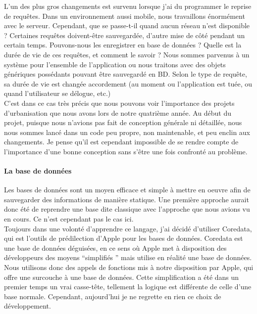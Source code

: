 \documentclass{article}
\begin{document}
		L'un des plus gros changements est survenu lorsque j'ai du programmer le reprise de requêtes. Dans un environnement aussi mobile, nous travaillons énormément avec le serveur. Cependant, que se passe-t-il quand aucun réseau n'est disponible ? Certaines requêtes doivent-être sauvegardée, d'autre mise de côté pendant un certain temps. Pouvons-nous les enregistrer en base de données ? Quelle est la durée de vie de ces requêtes, et comment le savoir ? Nous sommes parvenus à un système pour l'ensemble de l'application ou nous traitons avec des objets génériques possédants pouvant être sauvegardé en BD. Selon le type de requête, sa durée de vie est changée accordement (au moment ou l'application est tuée, ou quand l'utilisateur se délogue, etc.)  	\\
		
		C'est dans ce cas très précis que nous pouvons voir l'importance des projets d'urbanisation que nous avons lors de notre quatrième année. Au début du projet, puisque nous n'avions pas fait de conception générale ni détaillée, nous nous sommes lancé dans un code peu propre, non maintenable, et peu enclin aux changements. Je pense qu'il est cependant impossible de se rendre compte de l'importance d'une bonne conception sans s'être une fois confronté au problème. \\
				
		\paragraph{La base de données}
		Les bases de données sont un moyen efficace et simple à mettre en oeuvre afin de sauvegarder des informations de manière statique. Une première approche aurait donc été de reprendre une base dite classique avec l'approche que nous avions vu en cours. Ce n'est cependant pas le cas ici.\\
		
		Toujours dans une volonté d'apprendre ce langage, j'ai décidé d'utiliser Coredata, qui est l'outils de prédilection d'Apple pour les bases de données. Coredata est une base de données déguisées, en ce sens où Apple met à disposition des développeurs des moyens ``simplifiés '' mais utilise en réalité une base de données. Nous utilisons donc des appels de fonctions mis à notre disposition par Apple, qui offre une surcouche à une base de données. Cette simplification a été dans un premier temps un vrai casse-tête, tellement la logique est différente de celle d'une base normale. Cependant, aujourd'hui je ne regrette en rien ce choix de développement.\\
		
\end{document}
